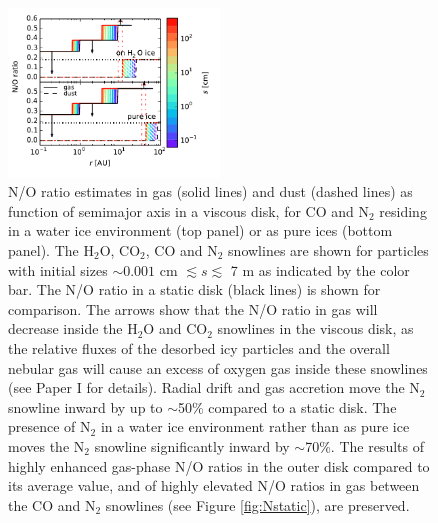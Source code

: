 \documentclass[apj]{emulateapj}
\begin{document}
\begin{figure}[h!]
\centering
\includegraphics[width=0.5\textwidth]{../../figs/N_O_water_ice.pdf}
\caption{N/O ratio estimates in gas (solid lines) and dust (dashed lines) as function of semimajor axis in a viscous disk, for CO and N$_2$ residing in a water ice environment (top panel) or as pure ices (bottom panel). The H$_2$O, CO$_2$, CO and N$_2$ snowlines are shown for particles with initial sizes $\sim0.001$ cm $\lesssim s \lesssim$ 7 m as indicated by the color bar. The N/O ratio in a static disk (black lines) is shown for comparison. The arrows show that the N/O ratio in gas will decrease inside the H$_2$O and CO$_2$ snowlines in the viscous disk, as the relative fluxes of the desorbed icy
particles and the overall nebular gas will cause an excess of oxygen gas inside these snowlines (see Paper I for details). Radial drift and gas accretion move the N$_2$ snowline inward by up to $\sim$50\% compared to a static disk. The presence of N$_2$ in a water ice environment rather than as pure ice moves the N$_2$ snowline significantly inward by $\sim$70\%. The results of highly enhanced gas-phase N/O ratios in the outer disk compared to its average value, and of highly elevated N/O ratios in gas between the CO and N$_2$ snowlines (see Figure \ref{fig:Nstatic}), are preserved.}  
\label{fig:NO_ratio}
\end{figure}
\end{document}
